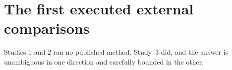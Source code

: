 \documentclass[10pt]{article}
\begin{document}
\section{The first executed external comparisons}
\label{sec:external}

Studies 1 and 2 ran no published method. Study~3 did, and the answer is unambiguous in one direction
and carefully bounded in the other.

\begin{table}[t]
\centering\footnotesize

\caption{Adapted published methods against the repaired mechanism at rank 16 with the coalition
policy. Every arm transforms or replaces \emph{only} the auxiliary channel and appends it to
unchanged $H_A$. \noteExternalVsRepaired}
\label{tab:extrep}
\end{table}
\end{document}
